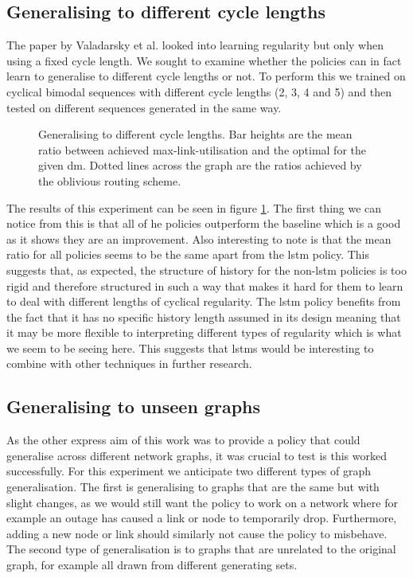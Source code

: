 \subsection{Generalising to different cycle lengths}
The paper by Valadarsky et al. looked into learning regularity but only when using a fixed cycle length. We sought to examine whether the policies can in fact learn to generalise to different cycle lengths or not. To perform this we trained on cyclical bimodal sequences with different cycle lengths (2, 3, 4 and 5) and then tested on different sequences generated in the same way.

\begin{figure}
    \centering
    
    \caption{Generalising to different cycle lengths. Bar heights are the mean ratio between achieved max-link-utilisation and the optimal for the given \ac{dm}. Dotted lines across the graph are the ratios achieved by the oblivious routing scheme.}
    \label{fig:exp_vary}
\end{figure}

The results of this experiment can be seen in figure \ref{fig:exp_vary}. The first thing we can notice from this is that all of he policies outperform the baseline which is a good as it shows they are an improvement. Also interesting to note is that the mean ratio for all policies seems to be the same apart from the \ac{lstm} policy. This suggests that, as expected, the structure of history for the non-\ac{lstm} policies is too rigid and therefore structured in such a way that makes it hard for them to learn to deal with different lengths of cyclical regularity. The \ac{lstm} policy benefits from the fact that it has no specific history length assumed in its design meaning that it may be more flexible to interpreting different types of regularity which is what we seem to be seeing here. This suggests that \acp{lstm} would be interesting to combine with other techniques in further research.

\subsection{Generalising to unseen graphs}
As the other express aim of this work was to provide a policy that could generalise across different network graphs, it was crucial to test is this worked successfully. For this experiment we anticipate two different types of graph generalisation. The first is generalising to graphs that are the same but with slight changes, as we would still want the policy to work on a network where for example an outage has caused a link or node to temporarily drop. Furthermore, adding a new node or link should similarly not cause the policy to misbehave. The second type of generalisation is to graphs that are unrelated to the original graph, for example all drawn from different generating sets.

